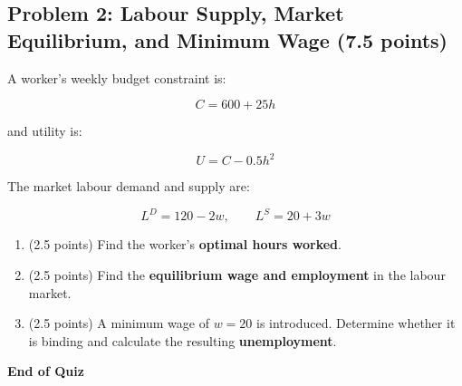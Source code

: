 \documentclass[11pt]{article}
\begin{document}
\subsection*{Problem 2: Labour Supply, Market Equilibrium, and Minimum Wage (7.5 points)}

A worker's weekly budget constraint is:

\[
C = 600 + 25h
\]

and utility is:

\[
U = C - 0.5h^2
\]

The market labour demand and supply are:

\[
L^D = 120 - 2w, 
\qquad 
L^S = 20 + 3w
\]

\begin{enumerate}
\item[(a)] (2.5 points)  
Find the worker's \textbf{optimal hours worked}.

\item[(b)] (2.5 points)  
Find the \textbf{equilibrium wage and employment} in the labour market.

\item[(c)] (2.5 points)  
A minimum wage of \( w = 20 \) is introduced.  
Determine whether it is binding and calculate the resulting \textbf{unemployment}.
\end{enumerate}

\vfill
\textbf{End of Quiz}
\end{document}
